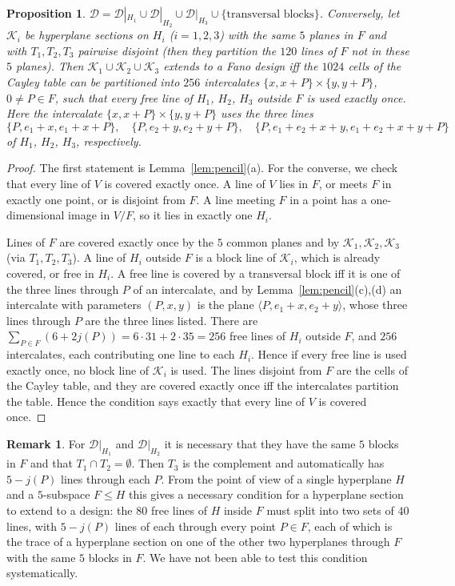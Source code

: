 \documentclass[11pt]{amsart}
\newtheorem{proposition}[theorem]{Proposition}
\theoremstyle{definition}
\newtheorem{remark}[theorem]{Remark}
\newcommand{\D}{\mathcal{D}}
\newcommand{\K}{\mathcal{K}}
\begin{document}
\begin{proposition}\label{prop:pencil}
$\D=\D|_{H_1}\cup\D|_{H_2}\cup\D|_{H_3}\cup\{\text{transversal blocks}\}$. Conversely, let $\K_i$ be hyperplane sections on $H_i$ \textup{(}$i=1,2,3$\textup{)} with the same $5$ planes in $F$ and with $T_1,T_2,T_3$ pairwise disjoint (then they partition the $120$ lines of $F$ not in these $5$ planes). Then $\K_1\cup\K_2\cup\K_3$ extends to a Fano design iff the $1024$ cells of the Cayley table can be partitioned into $256$ intercalates $\{x,x+P\}\times\{y,y+P\}$, $0\ne P\in F$, such that every free line of $H_1$, $H_2$, $H_3$ outside $F$ is used exactly once. Here the intercalate $\{x,x+P\}\times\{y,y+P\}$ uses the three lines
\[
\{P,e_1+x,e_1+x+P\},\quad \{P,e_2+y,e_2+y+P\},\quad \{P,e_1+e_2+x+y,e_1+e_2+x+y+P\}
\]
of $H_1$, $H_2$, $H_3$, respectively.
\end{proposition}
\begin{proof}
The first statement is Lemma~\ref{lem:pencil}(a). For the converse, we check that every line of $V$ is covered exactly once. A line of $V$ lies in $F$, or meets $F$ in exactly one point, or is disjoint from $F$. A line meeting $F$ in a point has a one-dimensional image in $V/F$, so it lies in exactly one $H_i$.

Lines of $F$ are covered exactly once by the $5$ common planes and by $\K_1,\K_2,\K_3$ (via $T_1,T_2,T_3$). A line of $H_i$ outside $F$ is a block line of $\K_i$, which is already covered, or free in $H_i$. A free line is covered by a transversal block iff it is one of the three lines through $P$ of an intercalate, and by Lemma~\ref{lem:pencil}(c),(d) an intercalate with parameters $(P,x,y)$ is the plane $\langle P,e_1+x,e_2+y\rangle$, whose three lines through $P$ are the three lines listed. There are $\sum_{P\in F}(6+2j(P))=6\cdot31+2\cdot35=256$ free lines of $H_i$ outside $F$, and $256$ intercalates, each contributing one line to each $H_i$. Hence if every free line is used exactly once, no block line of $\K_i$ is used. The lines disjoint from $F$ are the cells of the Cayley table, and they are covered exactly once iff the intercalates partition the table. Hence the condition says exactly that every line of $V$ is covered once.
\end{proof}

\begin{remark}\label{rem:pair}
For $\D|_{H_1}$ and $\D|_{H_2}$ it is necessary that they have the same $5$ blocks in $F$ and that $T_1\cap T_2=\emptyset$. Then $T_3$ is the complement and automatically has $5-j(P)$ lines through each $P$. From the point of view of a single hyperplane $H$ and a $5$-subspace $F\le H$ this gives a necessary condition for a hyperplane section to extend to a design: the $80$ free lines of $H$ inside $F$ must split into two sets of $40$ lines, with $5-j(P)$ lines of each through every point $P\in F$, each of which is the trace of a hyperplane section on one of the other two hyperplanes through $F$ with the same $5$ blocks in $F$. We have not been able to test this condition systematically.
\end{remark}
\end{document}
